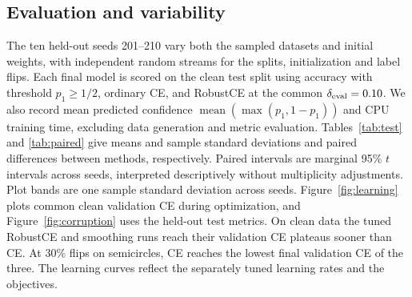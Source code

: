 \documentclass[11pt,a4paper]{article}
\begin{document}
\begin{table}[htbp]
\centering
\caption{Hyperparameters selected on the clean tuning runs. Strength denotes
$\delta$ for RobustCE and $\varepsilon$ for smoothing.}
\label{tab:settings}

\end{table}

\subsection{Evaluation and variability}
The ten held-out seeds 201--210 vary both the sampled datasets and initial
weights, with independent random streams for the splits, initialization and
label flips. Each final model is scored on the clean test split using
accuracy with threshold $p_1\geq1/2$, ordinary CE, and RobustCE at the
common $\delta_{\rm eval}=0.10$. We also record mean predicted confidence
$\operatorname{mean}(\max(p_1,1-p_1))$ and CPU training time, excluding data
generation and metric evaluation. Tables~\ref{tab:test} and
\ref{tab:paired} give means and sample standard deviations and paired
differences between methods, respectively. Paired intervals are marginal 95\%
$t$ intervals across seeds, interpreted descriptively without multiplicity
adjustments. Plot bands are one sample standard deviation across seeds.
Figure~\ref{fig:learning} plots common clean validation CE during
optimization, and Figure~\ref{fig:corruption} uses the held-out test metrics.
On clean data the tuned RobustCE and smoothing runs reach their
validation CE plateaus sooner than CE. At 30\% flips on semicircles,
CE reaches the lowest final validation CE of the three. The learning
curves reflect the separately tuned learning rates and the objectives.

\begin{table}[p]
\centering
\small
\caption{Clean test performance and training wall time over ten seeds
(mean $\pm$ sample SD). RobustCE uses the fixed evaluation radius $0.10$.
Conf. denotes mean predicted confidence.}
\label{tab:test}
\resizebox{\textwidth}{!}{}
\end{table}

\begin{table}[p]
\centering
\small
\caption{Paired test differences with marginal 95\% $t$ intervals.
R denotes RobustCE and S denotes smoothing. Contrasts subtract the second
method from the first. Accuracy differences are in percentage points.}
\label{tab:paired}
\resizebox{\textwidth}{!}{}
\end{table}
\end{document}
